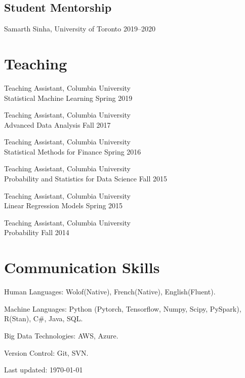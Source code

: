 \documentclass[letterpaper,200pt]{article}
\renewenvironment{itemize}{
  \begin{list}{}{
    \setlength{\leftmargin}{1.5em}
  }
}{
  \end{list}
}
\begin{document}
\subsection*{Student Mentorship}
\begin{itemize}
	\item Samarth Sinha, University of Toronto \hfill{2019--2020}
\end{itemize}


\section*{Teaching}
\begin{itemize}
	\item Teaching Assistant, Columbia University\\
	Statistical Machine Learning \hfill Spring 2019
	\item Teaching Assistant, Columbia University\\
	Advanced Data Analysis \hfill Fall 2017
	\item Teaching Assistant, Columbia University\\
	Statistical Methods for Finance \hfill Spring 2016
	\item Teaching Assistant, Columbia University\\
	Probability and Statistics for Data Science \hfill Fall 2015
	\item Teaching Assistant, Columbia University\\
	Linear Regression Models \hfill Spring 2015
	\item Teaching Assistant, Columbia University\\
	Probability \hfill Fall 2014
\end{itemize}

\section*{Communication Skills}
\begin{itemize}
	\item Human Languages: Wolof(Native), French(Native), English(Fluent).
	\item Machine Languages: Python (Pytorch, Tensorflow, Numpy, Scipy, PySpark), R(Stan), C\#, Java, SQL.
	\item Big Data Technologies: AWS, Azure.
	\item Version Control: Git, SVN.
\end{itemize}


\bigskip

\begin{center}
  \begin{footnotesize}
    Last updated: \today \\
  \end{footnotesize}
\end{center}
\end{document}
